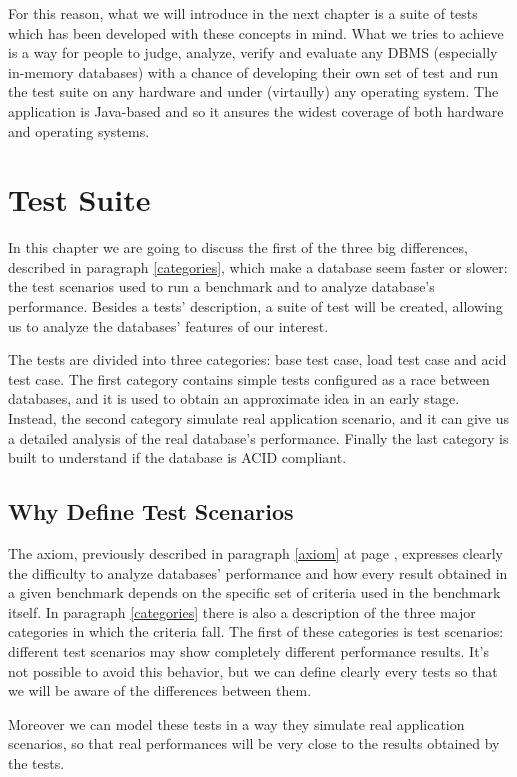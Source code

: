 For this reason, what we will introduce in the next chapter is a suite of tests which has been developed with these concepts in mind. What we tries to achieve is a way for people to judge, analyze, verify and evaluate any DBMS (especially in-memory databases) with a chance of developing their own set of test and run the test suite on any hardware and under (virtaully) any operating system. The application is Java-based and so it ansures the widest coverage of both hardware and operating systems.


\chapter{Test Suite} \label{test-suite}	
In this chapter we are going to discuss the first of the three big differences, described in paragraph \ref{categories}, which make a database seem faster or slower: the test scenarios used to run a benchmark and to analyze database's performance. Besides a tests' description, a suite of test will be created, allowing us to analyze the databases' features of our interest. 

The tests are divided into three categories: base test case, load test case and acid test case. The first category contains simple tests configured as a race between databases, and it is used to obtain an approximate idea in an early stage. Instead, the second category simulate real application scenario, and it can give us a detailed analysis of the real database's performance. Finally the last category is built to understand if the database is ACID compliant.


	\section{Why Define Test Scenarios}
The axiom, previously described in paragraph \ref{axiom} at page \pageref{axiom}, expresses clearly the difficulty to analyze databases' performance and how every result obtained in a given benchmark depends on the specific set of criteria used in the benchmark itself. In paragraph \ref{categories} there is also a description of the three major categories in which the criteria fall. The first of these categories is test scenarios: different test scenarios may show completely different performance results. It's not possible to avoid this behavior, but we can define clearly every tests so that we will be aware of the differences between them. 

Moreover we can model these tests in a way they simulate real application scenarios, so that real performances will be very close to the results obtained by the tests.

